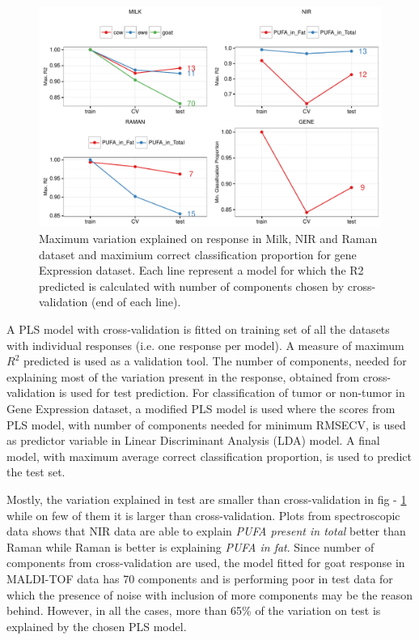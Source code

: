 \documentclass[10pt, a4paper]{article}\usepackage[]{graphicx}\usepackage[]{color}
\makeatletter
\def\maxwidth{ %
  \ifdim\Gin@nat@width>\linewidth
    \linewidth
  \else
    \Gin@nat@width
  \fi
}
\newenvironment{knitrout}{}{} %
\makeatother
\begin{document}
\begin{knitrout}\small
{}\color{fgcolor}\begin{figure}[H]
\includegraphics[width=\maxwidth]{figure/ValidationPlots-1} \caption[Maximum variation explained on response in Milk, NIR and Raman dataset and maximium correct classification proportion for gene Expression dataset]{Maximum variation explained on response in Milk, NIR and Raman dataset and maximium correct classification proportion for gene Expression dataset. Each line represent a model for which the R2 predicted is calculated with number of components chosen by cross-validation (end of each line).}\label{fig:ValidationPlots}
\end{figure}


\end{knitrout}

A PLS model with cross-validation is fitted on training set of all the datasets with individual responses (i.e. one response per model). A measure of maximum $R^2$ predicted is used as a validation tool. The number of components, needed for explaining most of the variation present in the response, obtained from cross-validation is used for test prediction. For classification of tumor or non-tumor in Gene Expression dataset, a modified PLS model is used where the scores from PLS model, with number of components needed for minimum RMSECV, is used as predictor variable in Linear Discriminant Analysis (LDA) model. A final model, with maximum average correct classification proportion, is used to predict the test set.

Mostly, the variation explained in test are smaller than cross-validation in fig - \ref{fig:ValidationPlots} while on few of them it is larger than cross-validation. Plots from spectroscopic data shows that NIR data are able to explain \textit{PUFA present in total} better than Raman while Raman is better is explaining \textit{PUFA in fat}. Since number of components from cross-validation are used, the model fitted for goat response in MALDI-TOF data has 70 components and is performing poor in test data for which the presence of noise with inclusion of more components may be the reason behind.  However, in all the cases, more than 65\% of the variation on test is explained by the chosen PLS model.
\end{document}
